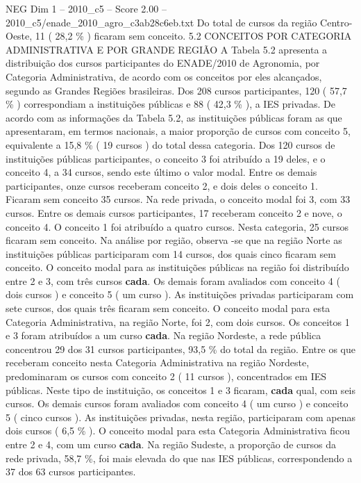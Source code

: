 \begin{textsample}{NEG Dim 1 – 2010\_c5 – Score 2.00 – 2010\_c5/enade\_2010\_agro\_c3ab28c6eb.txt}
Do total de cursos da região Centro-Oeste, 11 ( 28,2 \% ) ficaram sem conceito. 5.2 CONCEITOS POR CATEGORIA ADMINISTRATIVA E POR GRANDE REGIÃO A Tabela 5.2 apresenta a distribuição dos cursos participantes do ENADE/2010 de Agronomia, por Categoria Administrativa, de acordo com os conceitos por eles alcançados, segundo as Grandes Regiões brasileiras.
Dos 208 cursos participantes, 120 ( 57,7 \% ) correspondiam a instituições públicas e 88 ( 42,3 \% ), a IES privadas.
De acordo com as informações da Tabela 5.2, as instituições públicas foram as que apresentaram, em termos nacionais, a maior proporção de cursos com conceito 5, equivalente a 15,8 \% ( 19 cursos ) do total dessa categoria.
Dos 120 cursos de instituições públicas participantes, o conceito 3 foi atribuído a 19 deles, e o conceito 4, a 34 cursos, sendo este último o valor modal.
Entre os demais participantes, onze cursos receberam conceito 2, e dois deles o conceito 1.
Ficaram sem conceito 35 cursos.
Na rede privada, o conceito modal foi 3, com 33 cursos.
Entre os demais cursos participantes, 17 receberam conceito 2 e nove, o conceito 4.
O conceito 1 foi atribuído a quatro cursos.
Nesta categoria, 25 cursos ficaram sem conceito.
Na análise por região, observa -se que na região Norte as instituições públicas participaram com 14 cursos, dos quais cinco ficaram sem conceito.
O conceito modal para as instituições públicas na região foi distribuído entre 2 e 3, com três cursos \textbf{cada}.
Os demais foram avaliados com conceito 4 ( dois cursos ) e conceito 5 ( um curso ).
As instituições privadas participaram com sete cursos, dos quais três ficaram sem conceito.
O conceito modal para esta Categoria Administrativa, na região Norte, foi 2, com dois cursos.
Os conceitos 1 e 3 foram atribuídos a um curso \textbf{cada}.
Na região Nordeste, a rede pública concentrou 29 dos 31 cursos participantes, 93,5 \% do total da região.
Entre os que receberam conceito nesta Categoria Administrativa na região Nordeste, predominaram os cursos com conceito 2 ( 11 cursos ), concentrados em IES públicas.
Neste tipo de instituição, os conceitos 1 e 3 ficaram, \textbf{cada} qual, com seis cursos.
Os demais cursos foram avaliados com conceito 4 ( um curso ) e conceito 5 ( cinco cursos ).
As instituições privadas, nesta região, participaram com apenas dois cursos ( 6,5 \% ).
O conceito modal para esta Categoria Administrativa ficou entre 2 e 4, com um curso \textbf{cada}.
Na região Sudeste, a proporção de cursos da rede privada, 58,7 \%, foi mais elevada do que nas IES públicas, correspondendo a 37 dos 63 cursos participantes.

\end{textsample}
